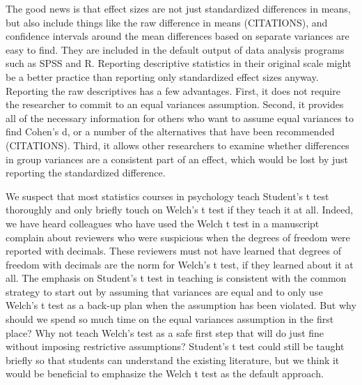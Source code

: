 \documentclass[man,a4paper,noextraspace,apacite]{apa6}\usepackage[]{graphicx}\usepackage[]{color}
\begin{document}
    The good news is that effect sizes are not just standardized differences in means, but also include things like the raw difference in means (CITATIONS), and confidence intervals around the mean differences based on separate variances are easy to find. They are included in the default output of data analysis programs such as SPSS and R. Reporting descriptive statistics in their original scale might be a better practice than reporting only standardized effect sizes anyway. Reporting the raw descriptives has a few advantages. First, it does not require the researcher to commit to an equal variances assumption. Second, it provides all of the necessary information for others who want to assume equal variances to find Cohen's d, or a number of the alternatives that have been recommended (CITATIONS). Third, it allows other researchers to examine whether differences in group variances are a consistent part of an effect, which would be lost by just reporting the standardized difference.

    We suspect that most statistics courses in psychology teach Student's t test thoroughly and only briefly touch on Welch's t test if they teach it at all. Indeed, we have heard colleagues who have used the Welch t test in a manuscript complain about reviewers who were suspicious when the degrees of freedom were reported with decimals. These reviewers must not have learned that degrees of freedom with decimals are the norm for Welch's t test, if they learned about it at all. The emphasis on Student's t test in teaching is consistent with the common strategy to start out by assuming that variances are equal and to only use Welch's t test as a back-up plan when the assumption has been violated. But why should we spend so much time on the equal variances assumption in the first place? Why not teach Welch's test as a safe first step that will do just fine without imposing restrictive assumptions? Student's t test could still be taught briefly so that students can understand the existing literature, but we think it would be beneficial to emphasize the Welch t test as the default approach. 







\end{document}
